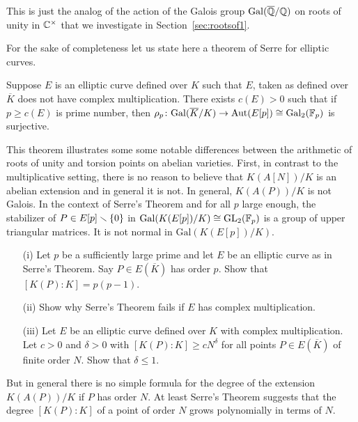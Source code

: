 This is just the analog of the action of the Galois group $\mathrm{Gal}({\overline{\mathbb{Q}}}/{\mathbb{Q}})$
on roots of unity in ${\mathbb{C}}^\times$ that we investigate in
Section~\ref{sec:rootsof1}.


For the sake of completeness let us state here a theorem of Serre for
elliptic curves.

\begin{theorem}[Serre]
  Suppose $E$ is an elliptic curve defined over $K$ such that $E$,
  taken as defined over $\overline K$ does
  not have complex multiplication. There exists $c(E)>0$ such that
  if $p\ge c(E)$ is prime number, then $\rho_p \colon
  \mathrm{Gal}(\overline{K}/K)\rightarrow \mathrm{Aut}(E[p]) \cong \mathrm{Gal}_2({\mathbb{F}}_p)$
  is surjective.  
\end{theorem}

This theorem illustrates some some notable differences between the
arithmetic of roots of unity and torsion points on abelian varieties.
First, in contrast to the multiplicative setting, there is no reason
to believe that $K(A[N])/K$ is an abelian extension and in general it
is not. In general, $K(A(P))/K$ is not Galois. In the context of
Serre's Theorem and for all $p$ large enough, the stabilizer of $P \in
E[p] \smallsetminus\{0\}$ in $\mathrm{Gal}(K(E[p])/K)\cong \mathrm{GL}_2({\mathbb{F}}_p)$
is a group of upper triangular matrices. It is not normal in
$\mathrm{Gal}(K(E[p])/K)$.

\begin{exercise}
  \begin{enumerate}
  \item [(i)]  Let $p$ be a sufficiently large prime and let $E$ be
    an elliptic curve as in Serre's Theorem. Say $P\in E(\overline K)$ has
    order $p$. Show that $[K(P):K] = p(p-1)$.
  \item[(ii)] Show why Serre's Theorem fails if $E$ has complex
    multiplication.
  \item[(iii)] Let $E$ be an elliptic curve defined over $K$  with
    complex multiplication. Let $c>0$ and $\delta>0$ with
    $[K(P):K]\ge c N^{\delta}$ for all points $P\in E(\overline K)$ of
    finite order $N$. Show that $\delta \le 1$. 
  \end{enumerate}
\end{exercise}

But in general there is no simple formula for the degree of the
extension $K(A(P))/K$ if $P$ has order $N$. At least Serre's Theorem
suggests that the degree $[K(P):K]$ of a point of order $N$ grows
polynomially in terms of $N$.

